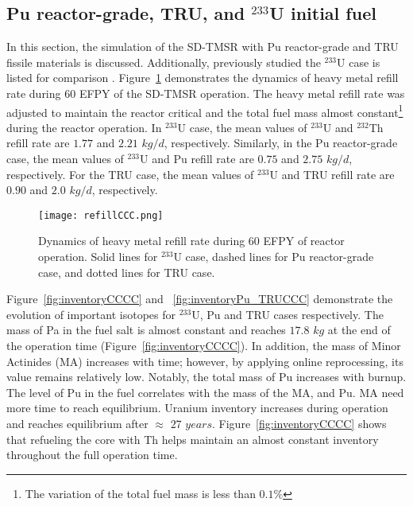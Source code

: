 \subsection{Pu reactor-grade, TRU, and $^{233}$U initial fuel}
In this section, the simulation of the SD-TMSR with Pu reactor-grade and TRU 
fissile materials is discussed. Additionally, previously studied the $^{233}$U 
case is listed for comparison \cite{ashraf2019whole_core}. 
Figure~\ref{fig:refillCCC} demonstrates the dynamics of heavy metal refill 
rate during 60 \gls{EFPY} of the SD-TMSR operation. The heavy metal refill 
rate was adjusted to maintain the reactor critical and the total fuel mass 
almost constant\footnote{The variation of the total fuel mass is less than 
$0.1\%$} during the reactor operation. In $^{233}$U case, the mean values of 
$^{233}$U and $^{232}$Th refill rate are $1.77$ and $2.21$ $kg/d$, 
respectively. Similarly, in the Pu reactor-grade case, the mean values of 
$^{233}$U and Pu refill rate are $0.75$ and $2.75$ $kg/d$, respectively. For  
the TRU case, the mean values of $^{233}$U and TRU refill rate are $0.90$ and 
$2.0$ $kg/d$, respectively.
\begin{figure}
	\centering
	\texttt{[image: refillCCC.png]}
			\vspace{-0.5in}
	\caption{Dynamics of heavy metal refill rate during 60 \gls{EFPY} of 
		reactor operation. Solid lines for $^{233}$U case, dashed lines for Pu 
		reactor-grade case, and dotted lines for TRU case.}
	\label{fig:refillCCC}
\end{figure}

Figure~\ref{fig:inventoryCCCC} and ~\ref{fig:inventoryPu_TRUCCC} demonstrate 
the evolution of important isotopes for $^{233}$U, Pu and TRU cases 
respectively. The mass of Pa in the fuel salt is almost constant and reaches 
$17.8$  $kg$ at the end of the operation time 
(Figure~\ref{fig:inventoryCCCC}). In addition, the mass of Minor Actinides 
(MA) increases with time; however, by applying online reprocessing, its value 
remains relatively low. Notably, the total mass of Pu increases with burnup. 
The level of Pu in the fuel correlates with the mass of the MA, and Pu. MA 
need more time to reach equilibrium. Uranium inventory increases during 
operation and reaches equilibrium after $\approx$ $27$ $years$. 
Figure~\ref{fig:inventoryCCCC} shows that refueling the core with Th helps 
maintain an almost constant inventory throughout the full operation time. 

